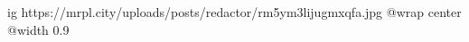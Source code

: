  
 
 
 
 

\ifcmt
  ig https://mrpl.city/uploads/posts/redactor/rm5ym3lijugmxqfa.jpg
  @wrap center
  @width 0.9
\fi
